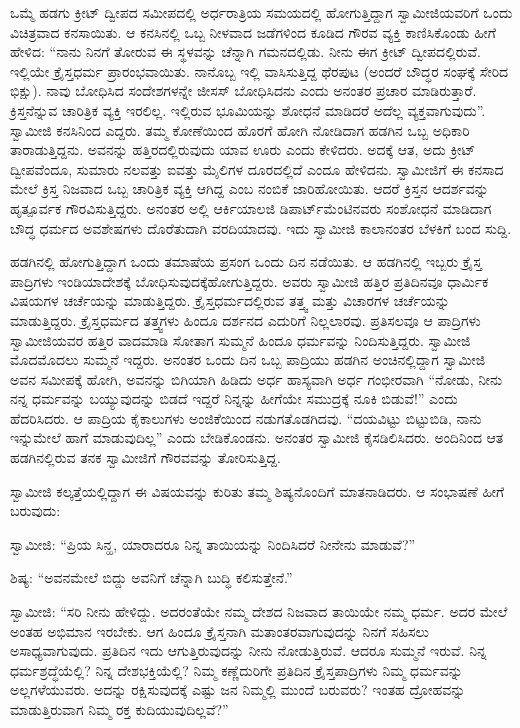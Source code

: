  ಒಮ್ಮೆ ಹಡಗು ಕ್ರೀಟ್ ದ್ವೀಪದ ಸಮೀಪದಲ್ಲಿ ಅರ್ಧರಾತ್ರಿಯ ಸಮಯದಲ್ಲಿ ಹೋಗುತ್ತಿದ್ದಾಗ ಸ್ವಾಮೀಜಿಯವರಿಗೆ ಒಂದು ವಿಚಿತ್ರವಾದ ಕನಸಾಯಿತು. ಆ ಕನಸಿನಲ್ಲಿ ಒಬ್ಬ ನೀಳವಾದ ಜಡೆಗಳಿಂದ ಕೂಡಿದ ಗೌರವ ವ್ಯಕ್ತಿ ಕಾಣಿಸಿಕೊಂಡು ಹೀಗೆ ಹೇಳಿದ: “ನಾನು ನಿನಗೆ ತೋರುವ ಈ ಸ್ಥಳವನ್ನು ಚೆನ್ನಾಗಿ ಗಮನದಲ್ಲಿಡು. ನೀನು ಈಗ ಕ್ರೀಟ್ ದ್ವೀಪದಲ್ಲಿರುವೆ. ಇಲ್ಲಿಯೇ ಕ್ರೈಸ್ತಧರ್ಮ ಪ್ರಾರಂಭವಾಯಿತು. ನಾನೊಬ್ಬ ಇಲ್ಲಿ ವಾಸಿಸುತ್ತಿದ್ದ ಥೆರಪುಟ (ಅಂದರೆ ಬೌದ್ಧರ ಸಂಘಕ್ಕೆ ಸೇರಿದ ಭಿಕ್ಷು). ನಾವು ಬೋಧಿಸಿದ ಸಂದೇಶಗಳನ್ನೇ ಜೀಸಸ್ ಬೋಧಿಸಿದನು ಎಂದು ಅನಂತರ ಪ್ರಚಾರ ಮಾಡಿರುತ್ತಾರೆ. ಕ್ರಿಸ್ತನೆನ್ನುವ ಚಾರಿತ್ರಿಕ ವ್ಯಕ್ತಿ ಇರಲಿಲ್ಲ. ಇಲ್ಲಿರುವ ಭೂಮಿಯನ್ನು ಶೋಧನೆ ಮಾಡಿದರೆ ಅದೆಲ್ಲ ವ್ಯಕ್ತವಾಗುವುದು”. ಸ್ವಾಮೀಜಿ ಕನಸಿನಿಂದ ಎದ್ದರು. ತಮ್ಮ ಕೋಣೆಯಿಂದ ಹೊರಗೆ ಹೋಗಿ ನೋಡಿದಾಗ ಹಡಗಿನ ಒಬ್ಬ ಅಧಿಕಾರಿ ತಾರಾಡುತ್ತಿದ್ದನು. ಅವನನ್ನು ಹತ್ತಿರದಲ್ಲಿರುವುದು ಯಾವ ಊರು ಎಂದು ಕೇಳಿದರು. ಅದಕ್ಕೆ ಆತ, ಅದು ಕ್ರೀಟ್ ದ್ವೀಪವೆಂದೂ, ಸುಮಾರು ನಲವತ್ತು ಐವತ್ತು ಮೈಲಿಗಳ ದೂರದಲ್ಲಿದೆ ಎಂದೂ ಹೇಳಿದನು. ಸ್ವಾಮೀಜಿಗೆ ಈ ಕನಸಾದ ಮೇಲೆ ಕ್ರಿಸ್ತ ನಿಜವಾದ ಒಬ್ಬ ಚಾರಿತ್ರಿಕ ವ್ಯಕ್ತಿ ಆಗಿದ್ದ ಎಂಬ ನಂಬಿಕೆ ಜಾರಿಹೋಯಿತು. ಆದರೆ ಕ್ರಿಸ್ತನ ಆದರ್ಶವನ್ನು ಹೃತ್ಪೂರ್ವಕ ಗೌರವಿಸುತ್ತಿದ್ದರು. ಅನಂತರ ಅಲ್ಲಿ ಆರ್ಕಿಯಾಲಜಿ ಡಿಪಾರ್ಟ್‍ಮೆಂಟಿನವರು ಸಂಶೋಧನೆ ಮಾಡಿದಾಗ ಬೌದ್ಧ ಧರ್ಮದ ಅವಶೇಷಗಳು ದೊರೆತುದಾಗಿ ವರದಿಯಾದವು. ಇದು ಸ್ವಾಮೀಜಿ ಕಾಲಾನಂತರ ಬೆಳಕಿಗೆ ಬಂದ ಸುದ್ದಿ. 

 ಹಡಗಿನಲ್ಲಿ ಹೋಗುತ್ತಿದ್ದಾಗ ಒಂದು ತಮಾಷೆಯ ಪ್ರಸಂಗ ಒಂದು ದಿನ ನಡೆಯಿತು. ಆ ಹಡಗಿನಲ್ಲಿ ಇಬ್ಬರು ಕ್ರೈಸ್ತ ಪಾದ್ರಿಗಳು ಇಂಡಿಯಾದೇಶಕ್ಕೆ ಬೋಧಿಸುವುದಕ್ಕೆ\break ಹೋಗುತ್ತಿದ್ದರು. ಅವರು ಸ್ವಾಮೀಜಿ ಹತ್ತಿರ ಪ್ರತಿದಿನವೂ ಧಾರ್ಮಿಕ ವಿಷಯಗಳ ಚರ್ಚೆಯನ್ನು ಮಾಡುತ್ತಿದ್ದರು. ಕ್ರೈಸ್ತಧರ್ಮದಲ್ಲಿರುವ ತತ್ತ್ವ ಮತ್ತು ವಿಚಾರಗಳ ಚರ್ಚೆಯನ್ನು ಮಾಡುತ್ತಿದ್ದರು. ಕ್ರೈಸ್ತಧರ್ಮದ ತತ್ತ್ವಗಳು ಹಿಂದೂ ದರ್ಶನದ ಎದುರಿಗೆ ನಿಲ್ಲಲಾರವು. ಪ್ರತಿಸಲವೂ ಆ ಪಾದ್ರಿಗಳು ಸ್ವಾಮೀಜಿಯವರ ಹತ್ತಿರ ವಾದಮಾಡಿ ಸೋತಾಗ ಸುಮ್ಮನೆ ಹಿಂದೂ ಧರ್ಮವನ್ನು ನಿಂದಿಸುತ್ತಿದ್ದರು. ಸ್ವಾಮೀಜಿ ಮೊದಮೊದಲು ಸುಮ್ಮನೆ ಇದ್ದರು. ಅನಂತರ ಒಂದು ದಿನ ಒಬ್ಬ ಪಾದ್ರಿಯು ಹಡಗಿನ ಅಂಚಿನಲ್ಲಿದ್ದಾಗ ಸ್ವಾಮೀಜಿ ಅವನ ಸಮೀಪಕ್ಕೆ ಹೋಗಿ, ಅವನನ್ನು ಬಿಗಿಯಾಗಿ ಹಿಡಿದು ಅರ್ಧ ಹಾಸ್ಯವಾಗಿ ಅರ್ಧ ಗಂಭೀರವಾಗಿ “ನೋಡು, ನೀನು ನನ್ನ ಧರ್ಮವನ್ನು ಬಯ್ಯುವುದನ್ನು ಬಿಡದೆ ಇದ್ದರೆ ನಿನ್ನನ್ನು ಹೀಗೆಯೇ ಸಮುದ್ರಕ್ಕೆ ನೂಕಿ ಬಿಡುವೆ!” ಎಂದು ಹೆದರಿಸಿದರು. ಆ ಪಾದ್ರಿಯ ಕೈಕಾಲುಗಳು ಅಂಜಿಕೆಯಿಂದ ನಡುಗತೊಡಗಿದವು. “ದಯವಿಟ್ಟು ಬಿಟ್ಟುಬಿಡಿ, ನಾನು ಇನ್ನುಮೇಲೆ ಹಾಗೆ ಮಾಡುವುದಿಲ್ಲ” ಎಂದು ಬೇಡಿಕೊಂಡನು. ಅನಂತರ ಸ್ವಾಮೀಜಿ ಕೈಸಡಿಲಿಸಿದರು. ಅಂದಿನಿಂದ ಆತ ಹಡಗಿನಲ್ಲಿರುವ ತನಕ ಸ್ವಾಮೀಜಿಗೆ ಗೌರವವನ್ನು ತೋರಿಸುತ್ತಿದ್ದ. 

 ಸ್ವಾಮೀಜಿ ಕಲ್ಕತ್ತೆಯಲ್ಲಿದ್ದಾಗ ಈ ವಿಷಯವನ್ನು ಕುರಿತು ತಮ್ಮ ಶಿಷ್ಯನೊಂದಿಗೆ ಮಾತನಾಡಿದರು. ಆ ಸಂಭಾಷಣೆ ಹೀಗೆ ಬರುವುದು: 

 ಸ್ವಾಮೀಜಿ: “ಪ್ರಿಯ ಸಿನ್ಹ, ಯಾರಾದರೂ ನಿನ್ನ ತಾಯಿಯನ್ನು ನಿಂದಿಸಿದರೆ ನೀನೇನು ಮಾಡುವೆ?” 

 ಶಿಷ್ಯ: “ಅವನಮೇಲೆ ಬಿದ್ದು ಅವನಿಗೆ ಚೆನ್ನಾಗಿ ಬುದ್ಧಿ ಕಲಿಸುತ್ತೇನೆ.” 

 ಸ್ವಾಮೀಜಿ: “ಸರಿ ನೀನು ಹೇಳಿದ್ದು. ಅದರಂತೆಯೇ ನಮ್ಮ ದೇಶದ ನಿಜವಾದ ತಾಯಿಯೇ ನಮ್ಮ ಧರ್ಮ. ಅದರ ಮೇಲೆ ಅಂತಹ ಅಭಿಮಾನ ಇರಬೇಕು. ಆಗ ಹಿಂದೂ ಕ್ರೈಸ್ತನಾಗಿ ಮತಾಂತರವಾಗುವುದನ್ನು ನಿನಗೆ ಸಹಿಸಲು ಅಸಾಧ್ಯವಾಗುವುದು. ಪ್ರತಿದಿನ ಇದು ಆಗುತ್ತಿರುವುದನ್ನು ನೀನು ನೋಡುತ್ತಿರುವೆ. ಆದರೂ ಸುಮ್ಮನೆ ಇರುವೆ. ನಿನ್ನ ಧರ್ಮಶ್ರದ್ಧೆಯೆಲ್ಲಿ? ನಿನ್ನ ದೇಶಭಕ್ತಿಯೆಲ್ಲಿ? ನಿಮ್ಮ ಕಣ್ಣೆದುರಿಗೇ ಪ್ರತಿದಿನ ಕ್ರೈಸ್ತಪಾದ್ರಿಗಳು ನಿಮ್ಮ ಧರ್ಮವನ್ನು ಅಲ್ಲಗಳೆಯುವರು. ಅದನ್ನು ರಕ್ಷಿಸುವುದಕ್ಕೆ ಎಷ್ಟು ಜನ ನಿಮ್ಮಲ್ಲಿ ಮುಂದೆ ಬರುವರು? ಇಂತಹ ದ್ರೋಹವನ್ನು ಮಾಡುತ್ತಿರುವಾಗ ನಿಮ್ಮ ರಕ್ತ ಕುದಿಯುವುದಿಲ್ಲವೆ?” 

